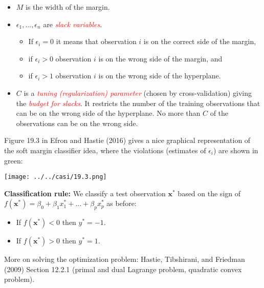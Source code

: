 \documentclass[10pt,ignorenonframetext,]{beamer}
\providecommand{\tightlist}{%
  \setlength{\itemsep}{0pt}\setlength{\parskip}{0pt}}
\begin{document}
\begin{frame}

\begin{itemize}
\item
  \(M\) is the width of the margin.
\item
  \(\epsilon_1,...,\epsilon_n\) are
  \emph{\textcolor{red}{slack variables}}.

  \begin{itemize}
  \tightlist
  \item
    If \(\epsilon_i=0\) it means that observation \(i\) is on the
    correct side of the margin,
  \item
    if \(\epsilon_i>0\) observation \(i\) is on the wrong side of the
    margin, and
  \item
    if \(\epsilon_i>1\) observation \(i\) is on the wrong side of the
    hyperplane.
  \end{itemize}
\item
  \(C\) is a \emph{\textcolor{red}{tuning (regularization) parameter}}
  (chosen by cross-validation) giving the
  \emph{\textcolor{red}{budget for slacks}}. It restricts the number of
  the training observations that can be on the wrong side of the
  hyperplane. No more than \(C\) of the observations can be on the wrong
  side.
\end{itemize}

\end{frame}

\begin{frame}

Figure 19.3 in Efron and Hastie (2016) gives a nice graphical
representation of the soft margin classifier idea, where the violations
(estimates of \(\epsilon_i\)) are shown in green:

\centering

\texttt{[image: ../../casi/19.3.png]}

\end{frame}

\begin{frame}

\textbf{Classification rule:} We classify a test observation
\({\boldsymbol x}^*\) based on the sign of
\(f({\boldsymbol x}^*)=\beta_0+\beta_1 x_1^*+...+\beta_p x_p^*\) as
before:

\begin{itemize}
\tightlist
\item
  If \(f({\boldsymbol x}^*)<0\) then \(y^*=-1\).
\item
  If \(f({\boldsymbol x}^*)>0\) then \(y^*=1\).
\end{itemize}

\vspace{3mm}

More on solving the optimization problem: Hastie, Tibshirani, and
Friedman (2009) Section 12.2.1 (primal and dual Lagrange problem,
quadratic convex problem).

\end{frame}
\end{document}
